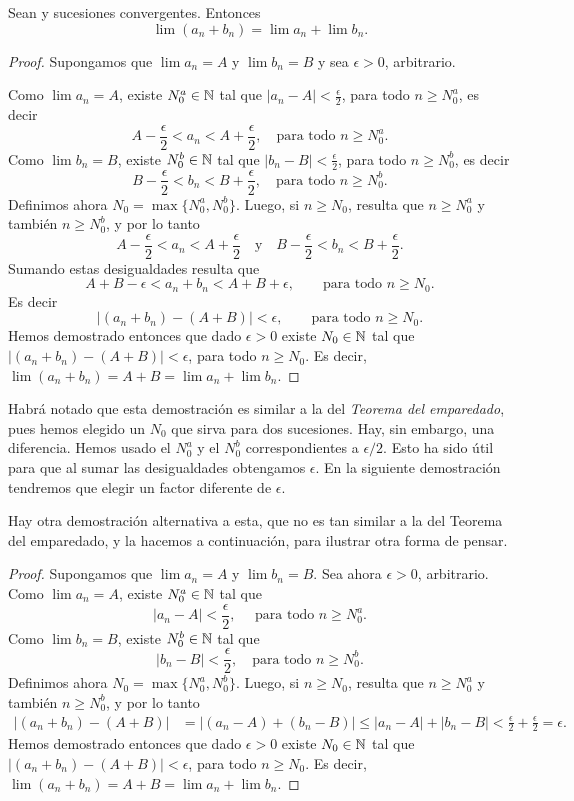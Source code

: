 \begin{proposition}
    Sean \sucan y \sucbn sucesiones convergentes. Entonces
    \[
    \lim (a_n+b_n) = \lim a_n + \lim b_n.
    \]
\end{proposition}

\begin{proof}
Supongamos que $\lim a_n = A$ y $\lim b_n = B$ y 
sea $\epsilon > 0$, arbitrario.

Como $\lim a_n = A$, existe $N_0^a \in \mathbb{N}$ tal que $|a_n - A| < \frac{\epsilon}2 $, para todo $n\ge N_0^a$, es decir
\[
A-\frac{\epsilon}2 < a_n < A + \frac{\epsilon}2 , \quad \text{para todo $n\ge N_0^a$}.
\]
Como $\lim b_n = B$, existe $N_0^b \in \mathbb{N}$ tal que $|b_n - B| < \frac{\epsilon}2 $, para todo $n\ge N_0^b$, es decir
\[
B-\frac{\epsilon}2 < b_n < B + \frac{\epsilon}2 , \quad \text{para todo $n\ge N_0^b$}.
\]
Definimos ahora $N_0 = \max\{N_0^a,N_0^b\}$. Luego, si $n\ge N_0$, resulta que $n\ge N_0^a$ y también $n \ge N_0^b$, y por lo tanto
\[
A-\frac{\epsilon}2 < a_n < A + \frac{\epsilon}2\quad\text{y}\quad B-\frac{\epsilon}2 < b_n < B + \frac{\epsilon}2.
\]
Sumando estas desigualdades resulta que
\[
A+B-\epsilon < a_n +  b_n < A+B + \epsilon, \qquad\text{para todo $n \ge N_0$}.
\]
Es decir
\[
|(a_n+b_n)-(A+B)| < \epsilon, \qquad\text{para todo $n \ge N_0$}.
\]
Hemos demostrado entonces que dado $\epsilon > 0$ existe $N_0\in\mathbb{N}$ tal que $|(a_n+b_n) - (A+B)| < \epsilon$, para todo $n \ge N_0$. Es decir, $\lim (a_n+b_n) = A+B = \lim a_n + \lim b_n$.
\end{proof}

Habrá notado que esta demostración es similar a la del \emph{Teorema del emparedado}, pues hemos elegido un $N_0$ que sirva para dos sucesiones. Hay, sin embargo, una diferencia. Hemos usado el $N_0^a$ y el $N_0^b$ correspondientes a $\epsilon/2$. Esto ha sido útil para que al sumar las desigualdades obtengamos $\epsilon$. En la siguiente demostración tendremos que elegir un factor diferente de $\epsilon$.

Hay otra demostración alternativa a esta, que no es tan similar a la del Teorema del emparedado, y la hacemos a continuación, para ilustrar otra forma de pensar.

\begin{proof}
Supongamos que $\lim a_n = A$ y $\lim b_n = B$.
Sea ahora $\epsilon > 0$, arbitrario.
Como $\lim a_n = A$, existe $N_0^a \in \mathbb{N}$ tal que 
\[
|a_n - A| < \frac{\epsilon}{2} ,\quad\text{ para todo $n\ge N_0^a$}.
\]
Como $\lim b_n = B$, existe $N_0^b \in \mathbb{N}$ tal que 
\[
|b_n - B| < \frac{\epsilon}{2}, \quad\text{para todo $n\ge N_0^b$}.
\]
Definimos ahora $N_0 = \max\{N_0^a,N_0^b\}$. Luego, si $n\ge N_0$, resulta que $n\ge N_0^a$ y también $n \ge N_0^b$, y por lo tanto
\begin{align*}
|(a_n +b_n) - (A+ B) | 
&= | (a_n-A) + (b_n-B)| 
\le  | a_n-A| + | b_n - B |
< \frac{\epsilon}2 + \frac{\epsilon}2 = \epsilon.
\end{align*}
Hemos demostrado entonces que dado $\epsilon > 0$ existe $N_0\in\mathbb{N}$ tal que $|(a_n+b_n) - (A+B)| < \epsilon$, para todo $n \ge N_0$. Es decir, $\lim (a_n+b_n) = A+B = \lim a_n + \lim b_n$.
\end{proof}

